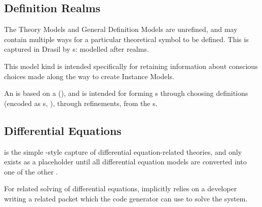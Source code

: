 \subsection{Definition Realms}

\currentDefiningExprHaskell{}

\currentMultiDefnHaskell{}

The Theory Models and General Definition Models are unrefined, and may contain
multiple ways for a particular theoretical symbol to be defined. This is
captured in Drasil by \EquationalRealm{}s: modelled after realms.

This model kind is intended specifically for retaining information about
conscious choices made along the way to create Instance Models.

An \EquationalRealm{} is based on a \MultiDefn{}
(), and is intended for forming \QDefinition{}s
through choosing definitions (encoded as \DefiningExpr{}s,
), through refinements, from the \MultiDefn{}s.



































\subsection{Differential Equations}

\DEModel{} is the simple \RelationConcept{}-style capture of differential
equation-related theories, and only exists as a placeholder until all
differential equation models are converted into one of the other \ModelKinds{}.

For related solving of differential equations, \DEModel{} implicitly relies on a
developer writing a related \ODEInfo{} packet which
the code generator can use to solve the system.

